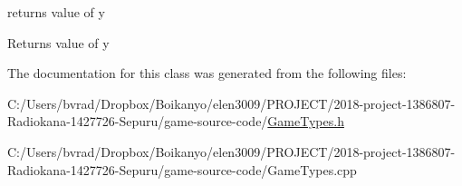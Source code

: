 returns value of y 

\begin{DoxyReturn}{Returns}
value of y 
\end{DoxyReturn}


The documentation for this class was generated from the following files\+:\begin{DoxyCompactItemize}
\item 
C\+:/\+Users/bvrad/\+Dropbox/\+Boikanyo/elen3009/\+P\+R\+O\+J\+E\+C\+T/2018-\/project-\/1386807-\/\+Radiokana-\/1427726-\/\+Sepuru/game-\/source-\/code/\mbox{\hyperlink{_game_types_8h}{Game\+Types.\+h}}\item 
C\+:/\+Users/bvrad/\+Dropbox/\+Boikanyo/elen3009/\+P\+R\+O\+J\+E\+C\+T/2018-\/project-\/1386807-\/\+Radiokana-\/1427726-\/\+Sepuru/game-\/source-\/code/Game\+Types.\+cpp\end{DoxyCompactItemize}
